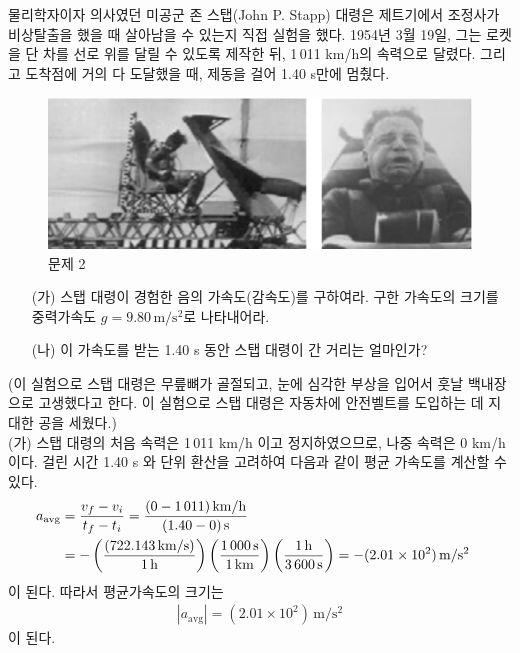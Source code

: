 \documentclass[APS,floatfix,nofootinbib,superscriptaddress,fleqn,preprint]{revtex4}
\begin{document}
물리학자이자 의사였던 미공군 존 스탭(John P. Stapp) 대령은 제트기에서
조정사가 비상탈출을 했을 때 살아남을 수 있는지 직접 실험을
했다. 1954년 3월 19일, 그는 로켓을 단 차를 선로 위를 달릴 수 있도록
제작한 뒤,  1\,011 km/h의 속력으로 달렸다. 그리고 도착점에 거의 다
도달했을 때, 제동을 걸어 1.40 s만에 멈췄다. 
\begin{figure}[htp]
  \centering
\includegraphics[scale=0.5]{Qfig3-2-20220307.png}  
  \caption{문제 2}
  \label{fig:2}
\end{figure}
\begin{itemize}
\item[(가)] 스탭 대령이 경험한 음의 가속도(감속도)를 구하여라. 구한
  가속도의 크기를 중력가속도 $g=9.80\,\mathrm{m/s^2}$로 나타내어라.
\item[(나)] 이 가속도를 받는 1.40 s  동안 스탭 대령이 간 거리는 얼마인가?
\end{itemize}
(이 실험으로 스탭 대령은 무릎뼈가 골절되고, 눈에 심각한 부상을 입어서
훗날 백내장으로 고생했다고 한다. 이 실험으로 스탭 대령은 자동차에 안전벨트를
도입하는 데 지대한 공을 세웠다.) \\
(가) 스탭 대령의 처음 속력은 1\,011 km/h 이고
    정지하였으므로, 나중 속력은 0 km/h 이다. 걸린 시간 1.40 s 와 단위
    환산을 고려하여 다음과 같이 평균 가속도를 계산할 수 있다. 
  \begin{align}
    a_{\mathrm{avg}} &= \frac{v_f-v_i}{t_f-t_i} =
              \frac{(0-1\,011)\,\mathrm{km/h}}{(1.40-0)\,\mathrm{s}} \cr
              &= -\left(\frac{(722.143\,\mathrm{km/s})}{1\,\mathrm{h}} \right)
                \left( \frac{1\,000\,\mathrm{s}}{1\,\mathrm{km}}\right)
                \left(\frac{1\,\mathrm{h}}{3\,600\,\mathrm{s}}\right)
                = - (2.01\times 10^2)\,\mathrm{m/s^2}
  \end{align} 
  이 된다. 따라서 평균가속도의 크기는 
  \begin{align*}
|a_{\mathrm{avg}}| =  (2.01\times 10^2)\,\mathrm{m/s^2}   
  \end{align*}
이 된다. 
\end{document}
